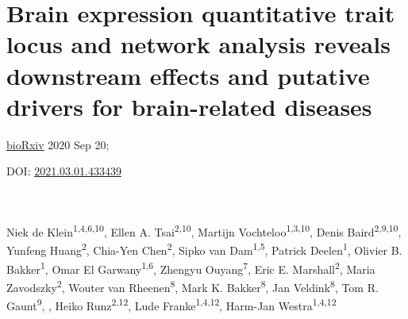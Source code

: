 \chapterfont{\color{DarkOrange}}  %
\sectionfont{\color{DarkOrange}}  %
\subsectionfont{\color{DarkOrange}}  %

\renewcommand\pcolor{DarkOrange}
\renewcommand{\headrule}{\hbox to\headwidth{%
		\color{DarkOrange}\leaders\hrule height \headrulewidth\hfill}} %
\fancyfoot[LE,RO]{\thepage}

{ \Large {} }

\chapter[Brain expression quantitative trait locus and network analysis reveals downstream effects and putative drivers for brain-related diseases ]{Brain expression quantitative trait locus and network analysis reveals downstream effects and putative drivers for brain-related diseases}
\chaptermark{}

\label{chap:chapter5-brain}

\hfill \underline{bioRxiv} 2020 Sep 20;

\hfill DOI: \href{https://doi.org/10.1101/2021.03.01.433439 }{2021.03.01.433439}

\noindent
\\
\\

Niek de Klein\textsuperscript{1,4,6,10}, Ellen A. Tsai\textsuperscript{2,10}, Martijn Vochteloo\textsuperscript{1,3,10}, Denis Baird\textsuperscript{2,9,10}, Yunfeng Huang\textsuperscript{2}, Chia-Yen Chen\textsuperscript{2}, Sipko van Dam\textsuperscript{1,5}, Patrick Deelen\textsuperscript{1}, Olivier B. Bakker\textsuperscript{1}, Omar El Garwany\textsuperscript{1,6}, Zhengyu Ouyang\textsuperscript{7}, Eric E. Marshall\textsuperscript{2}, Maria Zavodszky\textsuperscript{2}, Wouter van Rheenen\textsuperscript{8}, Mark K. Bakker\textsuperscript{8}, Jan Veldink\textsuperscript{8}, Tom R. Gaunt\textsuperscript{9}, , Heiko Runz\textsuperscript{2,12}, Lude Franke\textsuperscript{1,4,12}, Harm-Jan Westra\textsuperscript{1,4,12}






